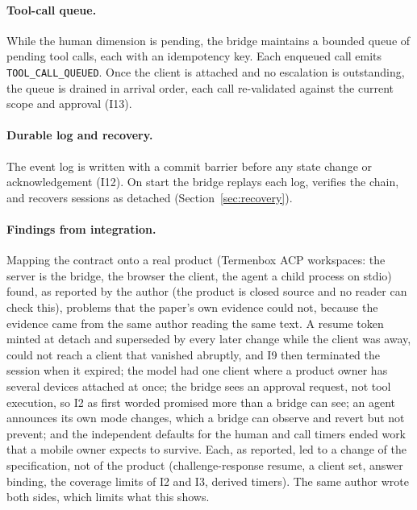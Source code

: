 \paragraph{Tool-call queue.} While the human dimension is pending,
the bridge maintains a bounded queue of pending tool calls, each with
an idempotency key. Each enqueued call emits
\texttt{TOOL\_CALL\_QUEUED}. Once the client is attached and no
escalation is outstanding, the queue is drained in arrival order, each
call re-validated against the current scope and approval (I13).

\paragraph{Durable log and recovery.} The event log is written with a
commit barrier before any state change or acknowledgement (I12). On
start the bridge replays each log, verifies the chain, and recovers
sessions as detached (Section~\ref{sec:recovery}).

\paragraph{Findings from integration.} Mapping the contract onto a real
product (Termenbox ACP workspaces: the server is the bridge, the browser
the client, the agent a child process on stdio) found, as reported by the
author (the product is closed source and no reader can check this), problems that the
paper's own evidence could not, because the evidence came from the same
author reading the same text. A resume token minted at detach and
superseded by every later change while the client was away, could not
reach a client that vanished abruptly, and I9 then terminated the
session when it expired; the model had one client where a product owner
has several devices attached at once; the bridge sees an approval
request, not tool execution, so I2 as first worded promised more than a
bridge can see; an agent announces its own mode changes, which a bridge
can observe and revert but not prevent; and the independent defaults for
the human and call timers ended work that a mobile owner expects to
survive. Each, as reported, led to a change of the specification, not of the product
(challenge-response resume, a client set, answer binding, the
coverage limits of I2 and I3, derived timers). The same author wrote
both sides, which limits what this shows.

